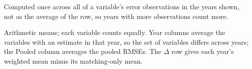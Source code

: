 \begin{table}[!htbp]
{\begin{threeparttable}
\begin{tablenotes}
\item[a] Computed once across all of a variable's error observations in the years shown, not as the average of the row, so years with more observations count more.
\item[b] Arithmetic means; each variable counts equally. Year columns average the variables with an estimate in that year, so the set of variables differs across years; the Pooled column averages the pooled RMSEs. The $\Delta$ row gives each year's weighted mean minus its matching-only mean.
\end{tablenotes}
\end{threeparttable}%
}
\end{table}